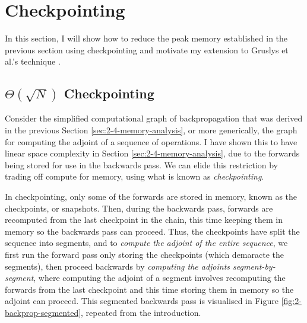 \section{Checkpointing} \label{sec:2-5-bg-checkpointing}
In this section, I will show how to reduce the peak memory established in the previous section using checkpointing and motivate my extension to Gruslys et al.'s technique \cite{Gruslys2016}.


\subsection{\texorpdfstring{\(\Theta(\sqrt{N})\)}{\textit{O(sqrt(N))}} Checkpointing}
Consider the simplified computational graph of backpropagation that was derived in the previous Section \ref{sec:2-4-memory-analysis}, or more generically, the graph for computing the adjoint of a sequence of operations.
I have shown this to have linear space complexity in Section \ref{sec:2-4-memory-analysis}, due to the forwards being stored for use in the backwards pass.
We can elide this restriction by trading off compute for memory, using what is known as \textit{checkpointing}.

In checkpointing, only some of the forwards are stored in memory, known as the checkpoints, or snapshots.
Then, during the backwards pass, forwards are recomputed from the last checkpoint in the chain, this time keeping them in memory so the backwards pass can proceed.
Thus, the checkpoints have split the sequence into segments, and
to \textit{compute the adjoint of the entire sequence}, we first run the forward pass only storing the checkpoints (which demaracte the segments),
then proceed backwards by \textit{computing the adjoints segment-by-segment},
where computing the adjoint of a segment involves recomputing the forwards from the last checkpoint and this time storing them in memory so the adjoint can proceed.
This segmented backwards pass is visualised in Figure \ref{fig:2-backprop-segmented}, repeated from the introduction.

